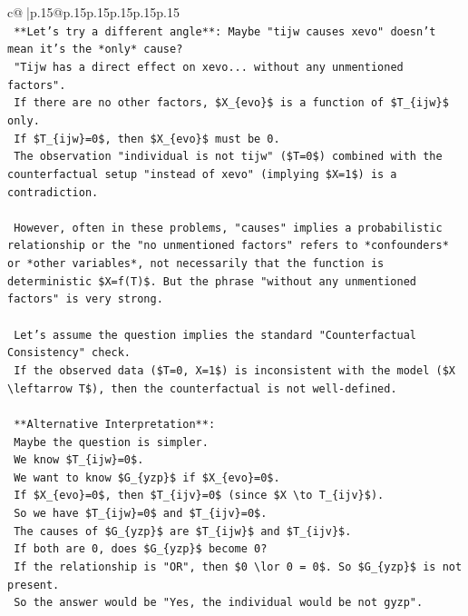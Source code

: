 \documentclass{article}
\begin{document}
{\begin{supertabular}{c@{$\;$}|p{.15\linewidth}@{}p{.15\linewidth}p{.15\linewidth}p{.15\linewidth}p{.15\linewidth}p{.15\linewidth}}
{{{\\ 
\texttt{    **Let's try a different angle**: Maybe "tijw causes xevo" doesn't mean it's the *only* cause?} \\
\texttt{    "Tijw has a direct effect on xevo... without any unmentioned factors".} \\
\texttt{    If there are no other factors, \$X\_\{evo\}\$ is a function of \$T\_\{ijw\}\$ only.} \\
\texttt{    If \$T\_\{ijw\}=0\$, then \$X\_\{evo\}\$ must be 0.} \\
\texttt{    The observation "individual is not tijw" (\$T=0\$) combined with the counterfactual setup "instead of xevo" (implying \$X=1\$) is a contradiction.} \\
\\ 
\texttt{    However, often in these problems, "causes" implies a probabilistic relationship or the "no unmentioned factors" refers to *confounders* or *other variables*, not necessarily that the function is deterministic \$X=f(T)\$. But the phrase "without any unmentioned factors" is very strong.} \\
\\ 
\texttt{    Let's assume the question implies the standard "Counterfactual Consistency" check.} \\
\texttt{    If the observed data (\$T=0, X=1\$) is inconsistent with the model (\$X \textbackslash{}leftarrow T\$), then the counterfactual is not well{-}defined.} \\
\\ 
\texttt{    **Alternative Interpretation**:} \\
\texttt{    Maybe the question is simpler.} \\
\texttt{    We know \$T\_\{ijw\}=0\$.} \\
\texttt{    We want to know \$G\_\{yzp\}\$ if \$X\_\{evo\}=0\$.} \\
\texttt{    If \$X\_\{evo\}=0\$, then \$T\_\{ijv\}=0\$ (since \$X \textbackslash{}to T\_\{ijv\}\$).} \\
\texttt{    So we have \$T\_\{ijw\}=0\$ and \$T\_\{ijv\}=0\$.} \\
\texttt{    The causes of \$G\_\{yzp\}\$ are \$T\_\{ijw\}\$ and \$T\_\{ijv\}\$.} \\
\texttt{    If both are 0, does \$G\_\{yzp\}\$ become 0?} \\
\texttt{    If the relationship is "OR", then \$0 \textbackslash{}lor 0 = 0\$. So \$G\_\{yzp\}\$ is not present.} \\
\texttt{    So the answer would be "Yes, the individual would be not gyzp".} \\
}}}
\end{supertabular}}
\end{document}
